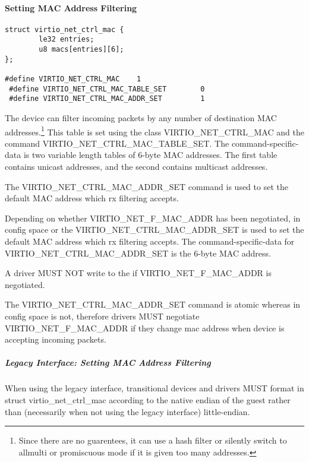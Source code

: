 \paragraph{Setting MAC Address Filtering}\label{sec:Device Types / Network Device / Device Operation / Control Virtqueue / Setting MAC Address Filtering}

\begin{lstlisting}
struct virtio_net_ctrl_mac {
        le32 entries;
        u8 macs[entries][6];
};

#define VIRTIO_NET_CTRL_MAC    1
 #define VIRTIO_NET_CTRL_MAC_TABLE_SET        0
 #define VIRTIO_NET_CTRL_MAC_ADDR_SET         1
\end{lstlisting}

The device can filter incoming packets by any number of destination
MAC addresses.\footnote{Since there are no guarentees, it can use a hash filter or
silently switch to allmulti or promiscuous mode if it is given too
many addresses.
} This table is set using the class
VIRTIO_NET_CTRL_MAC and the command VIRTIO_NET_CTRL_MAC_TABLE_SET. The
command-specific-data is two variable length tables of 6-byte MAC
addresses. The first table contains unicast addresses, and the second
contains multicast addresses.

The VIRTIO_NET_CTRL_MAC_ADDR_SET command is used to set the
default MAC address which rx filtering
accepts.

Depending on whether VIRTIO_NET_F_MAC_ADDR has been negotiated,
 in config space or the VIRTIO_NET_CTRL_MAC_ADDR_SET
is used to set the default MAC address which rx filtering
accepts.
The command-specific-data for VIRTIO_NET_CTRL_MAC_ADDR_SET is
the 6-byte MAC address.


A driver MUST NOT write to the  if VIRTIO_NET_F_MAC_ADDR is
negotiated.

The
VIRTIO_NET_CTRL_MAC_ADDR_SET command is atomic whereas
 in config space is not, therefore drivers
MUST negotiate VIRTIO_NET_F_MAC_ADDR if they change
mac address when device is accepting incoming packets.

\subparagraph{Legacy Interface: Setting MAC Address Filtering}\label{sec:Device Types / Network Device / Device Operation / Control Virtqueue / Setting MAC Address Filtering / Legacy Interface: Setting MAC Address Filtering}
When using the legacy interface, transitional devices and drivers
MUST format  in struct virtio_net_ctrl_mac
according to the native endian of the guest rather than
(necessarily when not using the legacy interface) little-endian.


